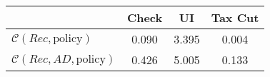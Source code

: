 \begin{tabular}{@{}lccc@{}} 
\toprule 
                          & Check      & UI    & Tax Cut    \\  \midrule 
$\mathcal{C}(Rec,\text{policy})$ & 0.090  & 3.395  & 0.004     \\ 
$\mathcal{C}(Rec, AD,\text{policy})$ & 0.426  & 5.005  & 0.133     \\ 
\end{tabular}  
